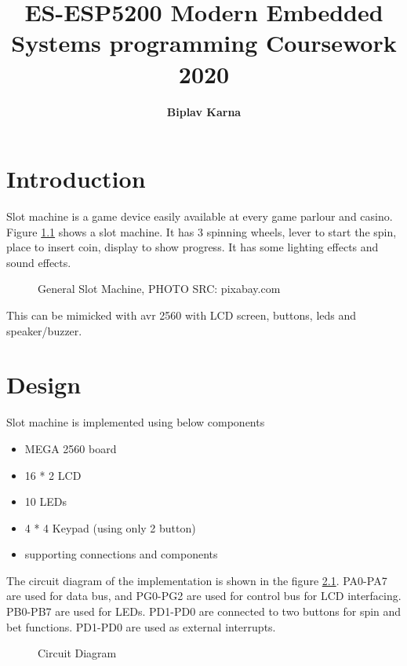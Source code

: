 \documentclass[a4paper,13pt,openany,sffamily]{memoir}
\title{\Huge\bfseries ES-ESP5200 Modern Embedded Systems programming Coursework 2020}
\author{\LARGE \bfseries Biplav Karna}
\begin{document}
\maketitle

\chapter {Introduction}
Slot machine is a game device easily available at every game parlour and casino. Figure \ref{Fig_Casino_Slot_Machine} shows a slot machine. It has 3 spinning wheels, lever to start the spin, place to insert coin, display to show progress. It has some lighting effects and sound effects. 

\begin{figure}[htbp]
\caption{General Slot Machine, PHOTO SRC: pixabay.com}
\label{Fig_Casino_Slot_Machine}
\end{figure}


This can be mimicked with avr 2560 with LCD screen, buttons, leds and speaker/buzzer.


\chapter {Design}
Slot machine is implemented using below components

\begin{itemize}
\item MEGA 2560 board
\item 16 * 2 LCD 
\item 10 LEDs
\item 4 * 4 Keypad (using only 2 button)
\item supporting connections and components 
\end{itemize}

The circuit diagram of the implementation is shown in the figure \ref{Fig_Circuit_Diagram}. PA0-PA7 are used for data bus, and PG0-PG2 are used for control bus for LCD interfacing. PB0-PB7 are used for LEDs. PD1-PD0 are connected to two buttons for spin and bet functions. PD1-PD0 are used as external interrupts. 

\begin{figure}[h]
\caption{Circuit Diagram }
\label{Fig_Circuit_Diagram}
\end{figure}
\end{document}
